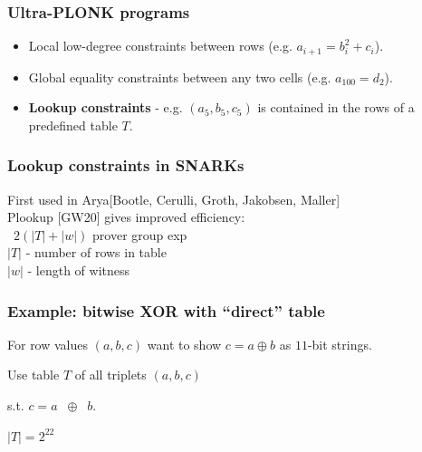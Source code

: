 \documentclass[shadesubsections,compress,14pt,mathserif]{beamer}
\begin{document}
\begin{frame}
\frametitle{ \textbf{Ultra}-PLONK  programs }   %
% 

\begin{itemize}
 \item Local low-degree constraints between rows (e.g. $a_{i+1}=b_i^2 + c_i$).
 \item Global equality constraints between any two cells (e.g. $a_{100} = d_2$).
 \item \textbf{Lookup constraints} - e.g. $(a_5,b_5,c_5)$ is contained in the rows of a predefined table $T$.
\end{itemize}

\end{frame}
\begin{frame}
\frametitle{Lookup constraints in SNARKs}   %
First used in Arya{\footnotesize [Bootle, Cerulli, Groth, Jakobsen, Maller]}\\ \pause
    \vspace{0.4in}
Plookup [GW20] gives improved efficiency:\\

~$2(|T|+|w|)$ prover group exp\\
    \vspace{0.4in}
$|T|$ - number of rows in table\\
$|w|$ - length of witness
\end{frame}
\begin{frame}
\frametitle{Example: bitwise XOR with ``direct'' table}   %
For row values $(a,b,c)$ want to show $c=a\oplus b$ as $11$-bit strings.\pause

    \vspace{0.2in}
 Use table $T$ of all triplets $(a,b,c)$
  
  s.t. $c=a\;\;\oplus\;\;b$.\pause
  
    \vspace{0.2in}
$|T| = 2^{22}$

\end{frame}
\end{document}
